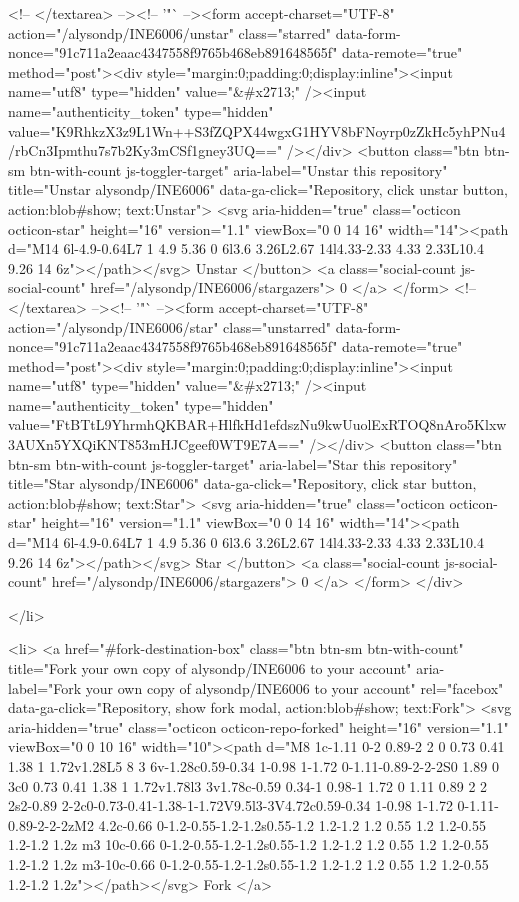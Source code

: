     <!-- </textarea> --><!-- '"` --><form accept-charset="UTF-8" action="/alysondp/INE6006/unstar" class="starred" data-form-nonce="91c711a2eaac4347558f9765b468eb891648565f" data-remote="true" method="post"><div style="margin:0;padding:0;display:inline"><input name="utf8" type="hidden" value="&#x2713;" /><input name="authenticity_token" type="hidden" value="K9RhkzX3z9L1Wn++S3fZQPX44wgxG1HYV8bFNoyrp0zZkHc5yhPNu4/rbCn3Ipmthu7s7b2Ky3mCSf1gney3UQ==" /></div>
      <button
        class="btn btn-sm btn-with-count js-toggler-target"
        aria-label="Unstar this repository" title="Unstar alysondp/INE6006"
        data-ga-click="Repository, click unstar button, action:blob#show; text:Unstar">
        <svg aria-hidden="true" class="octicon octicon-star" height="16" version="1.1" viewBox="0 0 14 16" width="14"><path d="M14 6l-4.9-0.64L7 1 4.9 5.36 0 6l3.6 3.26L2.67 14l4.33-2.33 4.33 2.33L10.4 9.26 14 6z"></path></svg>
        Unstar
      </button>
        <a class="social-count js-social-count" href="/alysondp/INE6006/stargazers">
          0
        </a>
</form>
    <!-- </textarea> --><!-- '"` --><form accept-charset="UTF-8" action="/alysondp/INE6006/star" class="unstarred" data-form-nonce="91c711a2eaac4347558f9765b468eb891648565f" data-remote="true" method="post"><div style="margin:0;padding:0;display:inline"><input name="utf8" type="hidden" value="&#x2713;" /><input name="authenticity_token" type="hidden" value="FtBTtL9YhrmhQKBAR+HlfkHd1efdszNu9kwUuolExRTOQ8nAro5Klxw3AUXn5YXQiKNT853mHJCgeef0WT9E7A==" /></div>
      <button
        class="btn btn-sm btn-with-count js-toggler-target"
        aria-label="Star this repository" title="Star alysondp/INE6006"
        data-ga-click="Repository, click star button, action:blob#show; text:Star">
        <svg aria-hidden="true" class="octicon octicon-star" height="16" version="1.1" viewBox="0 0 14 16" width="14"><path d="M14 6l-4.9-0.64L7 1 4.9 5.36 0 6l3.6 3.26L2.67 14l4.33-2.33 4.33 2.33L10.4 9.26 14 6z"></path></svg>
        Star
      </button>
        <a class="social-count js-social-count" href="/alysondp/INE6006/stargazers">
          0
        </a>
</form>  </div>

  </li>

  <li>
          <a href="#fork-destination-box" class="btn btn-sm btn-with-count"
              title="Fork your own copy of alysondp/INE6006 to your account"
              aria-label="Fork your own copy of alysondp/INE6006 to your account"
              rel="facebox"
              data-ga-click="Repository, show fork modal, action:blob#show; text:Fork">
              <svg aria-hidden="true" class="octicon octicon-repo-forked" height="16" version="1.1" viewBox="0 0 10 16" width="10"><path d="M8 1c-1.11 0-2 0.89-2 2 0 0.73 0.41 1.38 1 1.72v1.28L5 8 3 6v-1.28c0.59-0.34 1-0.98 1-1.72 0-1.11-0.89-2-2-2S0 1.89 0 3c0 0.73 0.41 1.38 1 1.72v1.78l3 3v1.78c-0.59 0.34-1 0.98-1 1.72 0 1.11 0.89 2 2 2s2-0.89 2-2c0-0.73-0.41-1.38-1-1.72V9.5l3-3V4.72c0.59-0.34 1-0.98 1-1.72 0-1.11-0.89-2-2-2zM2 4.2c-0.66 0-1.2-0.55-1.2-1.2s0.55-1.2 1.2-1.2 1.2 0.55 1.2 1.2-0.55 1.2-1.2 1.2z m3 10c-0.66 0-1.2-0.55-1.2-1.2s0.55-1.2 1.2-1.2 1.2 0.55 1.2 1.2-0.55 1.2-1.2 1.2z m3-10c-0.66 0-1.2-0.55-1.2-1.2s0.55-1.2 1.2-1.2 1.2 0.55 1.2 1.2-0.55 1.2-1.2 1.2z"></path></svg>
            Fork
          </a>

